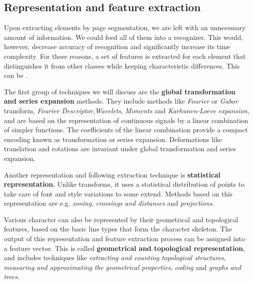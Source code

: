 \subsection{Representation and feature extraction}

Upon extracting elements by page segmentation, we are left with an unnecessary amount of information. We could feed all of them into a recognizer. This would, however, decrease accuracy of recognition and significantly increase its time complexity. For these reasons, a set of features is extracted for each element that distinguishes it from other classes while keeping characteristic differences. This can be  \citep{featureExtractionBook}.

\begin{description}

\item The first group of techniques we will discuss are the \textbf{global transformation and series expansion}  methods. They  include methods like \emph{Fourier} or \emph{Gabor} transform, \emph{Fourier Descriptor},\emph{Wavelets}, \emph{Moments} and \emph{Karhunen-Loeve expansion},  and are based on the representation of continuous signals by a linear combination of simpler functions. The coefficients of the linear combination provide a compact encoding known as transformation or series expansion. Deformations like translation and rotations are invariant under global transformation and series expansion.

\item Another  representation and following extraction technique is \textbf{statistical representation}. Unlike transforms, it uses a statistical distribution of points to take care of font and style variations to some extend. Methods based on this representation are e.g. \emph{zoning}, \emph{crossings and distances} and \emph{projections}.

\item Various character can also be represented by their geometrical and topological features, based on the basic line types that form the character skeleton. The output of this representation and feature extraction process can be assigned into a feature vector.
This is called \textbf{geometrical and topological representation}, and includes techniques like \emph{extracting and counting topological structures}, \emph{measuring and approximating the geometrical properties}, \emph{coding} and \emph{graphs and trees}.
\end{description}

